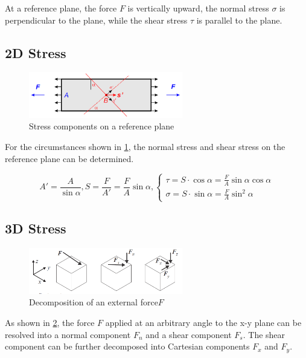 \documentclass[en,hazy,cyan,8pt,normal]{elegantnote}
\begin{document}
    At a reference plane, the force $F$ is vertically upward, the normal stress $\sigma$ is perpendicular to the plane, while the shear stress $\tau$ is parallel to the plane.

  \subsection{2D Stress}
    \begin{figure}[H]
      \centering
      \includegraphics[width=0.6\textwidth]{image/001.png}
      \caption{Stress components on a reference plane}
      \label{fig:001}
    \end{figure}

    For the circumstances shown in \cref{fig:001}, the normal stress and shear stress on the reference plane can be determined.

    \begin{equation}\label{eq:002}
      A'=\frac{A}{\sin \alpha}, S=\frac{F}{A'}=\frac{F}{A} \sin \alpha,
      \begin{cases}
        \tau=S\cdot\cos\alpha=\frac{F}{A} \sin \alpha \cos \alpha\\
        \sigma=S\cdot\sin\alpha=\frac{F}{A} \sin^2 \alpha
      \end{cases}
    \end{equation}

  \subsection{3D Stress}
    \begin{figure}[H]
      \centering
      \includegraphics[width=0.6\textwidth]{image/002.png}
      \caption{Decomposition of an external force$F$}
      \label{fig:002}
    \end{figure}

    As shown in \cref{fig:002}, the force $F$ applied at an arbitrary angle to the x-y plane can be resolved into a normal component $F_n$ and a shear component $F_s$. The shear component can be further decomposed into Cartesian components $F_x$ and $F_y$.
\end{document}
